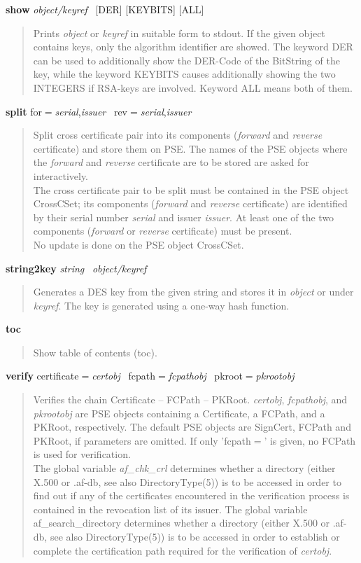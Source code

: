 {\bf show} {\em object/keyref}~ [DER] [KEYBITS] [ALL]
\begin{quote}
Prints {\em object} or {\em keyref} in suitable form to stdout. If the given object contains
keys, only the algorithm identifier are showed. The keyword DER can be used to additionally
show the DER-Code of the BitString of the key, while the keyword KEYBITS causes
additionally showing the two INTEGERS if RSA-keys are involved. Keyword ALL means both of them.
\end{quote}


{\bf split} for$=${\em serial},{\em issuer}~ rev$=${\em serial},{\em issuer}
\begin{quote}
Split cross certificate pair into its components ({\em forward} and {\em reverse} certificate)
and store them on PSE. The names of the PSE objects where the {\em forward} and {\em reverse} 
certificate are to be stored are asked for interactively. \\
The cross certificate pair to be split must be contained in the PSE object CrossCSet;
its components ({\em forward} and {\em reverse} certificate) are identified by their serial 
number {\em serial} and issuer {\em issuer}. At least one of the two components 
({\em forward} or {\em reverse} certificate) must be present. \\
No update is done on the PSE object CrossCSet.
\end{quote}

{\bf string2key} {\em string}~ {\em object/keyref} 
\begin{quote}
Generates a DES key from the given string and stores it in {\em object} or under {\em keyref}. The
key is generated using a one-way hash function.
\end{quote}

{\bf toc}
\begin{quote}
Show table of contents (toc). 
\end{quote}

{\bf verify} certificate$=${\em certobj}~ fcpath$=${\em fcpathobj}~ pkroot$=${\em pkrootobj}~ 
\begin{quote}
Verifies the chain Certificate -- FCPath -- PKRoot. {\em certobj}, {\em fcpathobj}, and {\em pkrootobj}
are PSE objects containing a Certificate, a FCPath, and a PKRoot, respectively. The default PSE objects
are SignCert, FCPath and PKRoot, if parameters are omitted. If only 'fcpath$=$' is given,
no FCPath is used for verification. \\
The global variable {\em af\_chk\_crl} determines whether a directory (either X.500 or .af-db, see also 
DirectoryType(5)) is to be accessed
in order to find out if any of the certificates encountered in the verification process is 
contained in the revocation list of its issuer.
The global variable {af\_search\_directory} determines whether a directory (either X.500 or .af-db, see also 
DirectoryType(5)) is to be accessed
in order to establish or complete the certification path required for the verification of {\em certobj}. 
\end{quote}

